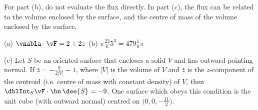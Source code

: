 \begin{hint} 
For part (b), do not evaluate the flux directly.
In part (c), the flux can be related to the volume enclosed by the
surface, and the centre of mass of the volume enclosed by the surface.

\end{hint}

\begin{answer} 
(a) $\vnabla\cdot\vF =2+2z$\qquad
(b) $\pi\frac{23}{6} 5^3 =479\frac{1}{6}\pi$  

(c) Let $S$ be an oriented surface that encloses a solid $V$ and has outward pointing normal. If $\bar z = -\frac{9}{2|V|}-1$, where $|V|$ is the 
volume of $V$ and $\bar z$ is the $z$-component of the centroid
(i.e. centre of mass with constant density) of $V$, then 
$\dblInt_{S} \vF\cdot\hn\,\dee{S}=-9$. One surface which obeys 
this condition is the unit cube (with outward normal)
centred on $\big(0,0, -\frac{11}{2}\big)$.
\end{answer}

